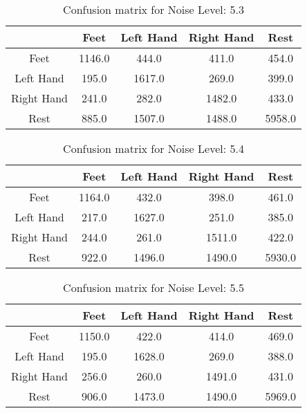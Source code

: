 \begin{table}[!htbp]
    \centering
    \begin{tabular}{|c||c|c|c|c|}
        \hline
		 & Feet & Left Hand & Right Hand & Rest \\
        \hline
        \hline
        Feet & 1146.0 & 444.0 & 411.0 & 454.0 \\
        \hline
        Left Hand & 195.0 & 1617.0 & 269.0 & 399.0 \\
        \hline
        Right Hand & 241.0 & 282.0 & 1482.0 & 433.0 \\
        \hline
        Rest & 885.0 & 1507.0 & 1488.0 & 5958.0 \\
        \hline
    \end{tabular}
    \caption{Confusion matrix for Noise Level: 5.3}
\end{table}

\begin{table}[!htbp]
    \centering
    \begin{tabular}{|c||c|c|c|c|}
        \hline
		 & Feet & Left Hand & Right Hand & Rest \\
        \hline
        \hline
        Feet & 1164.0 & 432.0 & 398.0 & 461.0 \\
        \hline
        Left Hand & 217.0 & 1627.0 & 251.0 & 385.0 \\
        \hline
        Right Hand & 244.0 & 261.0 & 1511.0 & 422.0 \\
        \hline
        Rest & 922.0 & 1496.0 & 1490.0 & 5930.0 \\
        \hline
    \end{tabular}
    \caption{Confusion matrix for Noise Level: 5.4}
\end{table}

\begin{table}[!htbp]
    \centering
    \begin{tabular}{|c||c|c|c|c|}
        \hline
		 & Feet & Left Hand & Right Hand & Rest \\
        \hline
        \hline
        Feet & 1150.0 & 422.0 & 414.0 & 469.0 \\
        \hline
        Left Hand & 195.0 & 1628.0 & 269.0 & 388.0 \\
        \hline
        Right Hand & 256.0 & 260.0 & 1491.0 & 431.0 \\
        \hline
        Rest & 906.0 & 1473.0 & 1490.0 & 5969.0 \\
        \hline
    \end{tabular}
    \caption{Confusion matrix for Noise Level: 5.5}
\end{table}

